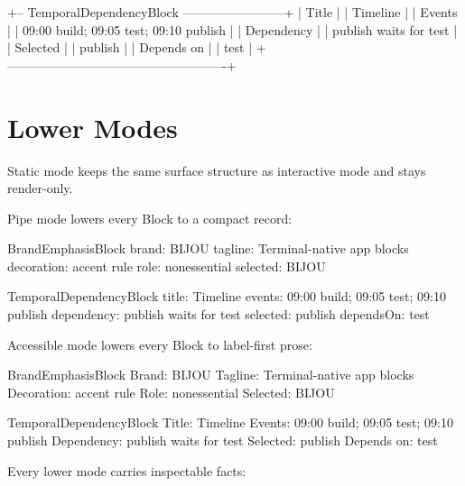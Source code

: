 \begin{CodeBlock}
+-- TemporalDependencyBlock ------------------------+
| Title                                              |
|   Timeline                                         |
| Events                                             |
|   09:00 build; 09:05 test; 09:10 publish           |
| Dependency                                         |
|   publish waits for test                           |
| Selected                                           |
|   publish                                          |
| Depends on                                         |
|   test                                             |
+----------------------------------------------------+
\end{CodeBlock}

\section{Lower Modes}\label{record-099-lower-modes}

Static mode keeps the same surface structure as interactive mode and stays render-only.

Pipe mode lowers every Block to a compact record:

\begin{CodeBlock}
BrandEmphasisBlock
brand: BIJOU
tagline: Terminal-native app blocks
decoration: accent rule
role: nonessential
selected: BIJOU
\end{CodeBlock}

\begin{CodeBlock}
TemporalDependencyBlock
title: Timeline
events: 09:00 build; 09:05 test; 09:10 publish
dependency: publish waits for test
selected: publish
dependsOn: test
\end{CodeBlock}

Accessible mode lowers every Block to label-first prose:

\begin{CodeBlock}
BrandEmphasisBlock
Brand: BIJOU
Tagline: Terminal-native app blocks
Decoration: accent rule
Role: nonessential
Selected: BIJOU
\end{CodeBlock}

\begin{CodeBlock}
TemporalDependencyBlock
Title: Timeline
Events: 09:00 build; 09:05 test; 09:10 publish
Dependency: publish waits for test
Selected: publish
Depends on: test
\end{CodeBlock}

Every lower mode carries inspectable facts:

